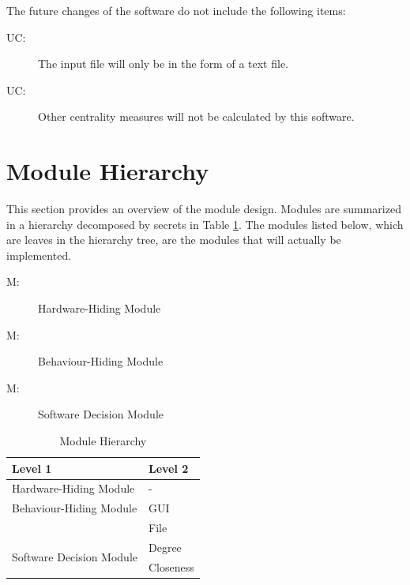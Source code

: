 \documentclass[12pt, titlepage]{article}
\newcounter{ucnum}
\newcommand{\uctheucnum}{UC\theucnum}
\newcounter{mnum}
\newcommand{\mthemnum}{M\themnum}
\begin{document}
The future changes of the software do not include the following items:

\begin{description}
\item[ \uctheucnum \label{ucIO}:] The input file will only be in the form of a text file.
\item[ \uctheucnum \label{measure}:] Other centrality measures will not be calculated by this software.
\end{description}

\section{Module Hierarchy} \label{SecMH}

This section provides an overview of the module design. Modules are summarized
in a hierarchy decomposed by secrets in Table \ref{TblMH}. The modules listed
below, which are leaves in the hierarchy tree, are the modules that will
actually be implemented.

\begin{description}
\item [ \mthemnum \label{mHH}:] Hardware-Hiding Module
\item [ \mthemnum \label{mHH}:] Behaviour-Hiding Module
\item [ \mthemnum \label{mHH}:] Software Decision Module
\end{description}


\begin{table}[h!]
\centering
\begin{tabular}{p{} p{}}
\toprule
\textbf{Level 1} & \textbf{Level 2}\\
\midrule

{Hardware-Hiding Module} & - \\
\midrule

{Behaviour-Hiding Module} & GUI\\ & File\\
\midrule

\multirow{3}{0.3\textwidth}{Software Decision Module} & Degree\\ & Closeness\\
\bottomrule

\end{tabular}
\caption{Module Hierarchy}
\label{TblMH}
\end{table}
\end{document}
